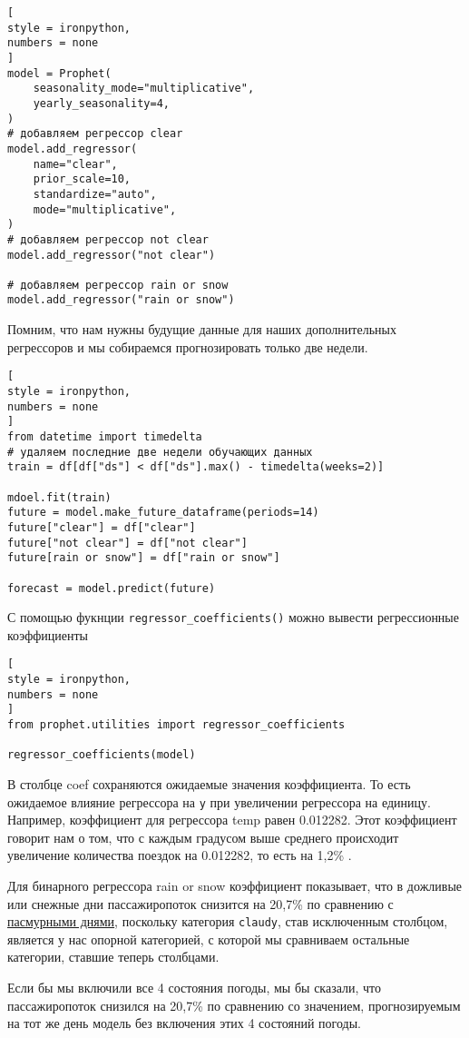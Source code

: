 \documentclass[%
	11pt,
	a4paper,
	utf8,
		]{article}
\begin{document}
\begin{lstlisting}[
style = ironpython,
numbers = none
]
model = Prophet(
    seasonality_mode="multiplicative",
    yearly_seasonality=4,
)
# добавляем регрессор clear
model.add_regressor(
    name="clear",
    prior_scale=10,
    standardize="auto",
    mode="multiplicative",
)
# добавляем регрессор not clear
model.add_regressor("not clear")

# добавляем регрессор rain or snow
model.add_regressor("rain or snow")
\end{lstlisting}

Помним, что нам нужны будущие данные для наших дополнительных регрессоров и мы собираемся прогнозировать только две недели.
\begin{lstlisting}[
style = ironpython,
numbers = none
]
from datetime import timedelta
# удаляем последние две недели обучающих данных
train = df[df["ds"] < df["ds"].max() - timedelta(weeks=2)]

mdoel.fit(train)
future = model.make_future_dataframe(periods=14)
future["clear"] = df["clear"]
future["not clear"] = df["not clear"]
future[rain or snow"] = df["rain or snow"]

forecast = model.predict(future)
\end{lstlisting}

С помощью фукнции \verb|regressor_coefficients()| можно вывести регрессионные коэффициенты
\begin{lstlisting}[
style = ironpython,
numbers = none	
]
from prophet.utilities import regressor_coefficients

regressor_coefficients(model)
\end{lstlisting}

В столбце coef сохраняются ожидаемые значения коэффициента. То есть ожидаемое влияние регрессора на \verb|y| при увеличении регрессора на единицу. Например, коэффициент для регрессора temp равен 0.012282. Этот коэффициент говорит нам о том, что с каждым градусом выше среднего происходит увеличение количества поездок на 0.012282, то есть на 1,2\% \cite[]{gruzdev:time-series-2022}.

Для бинарного регрессора rain or snow коэффициент показывает, что в дожливые или снежные дни пассажиропоток снизится на 20,7\% по сравнению с \underline{пасмурными днями}, поскольку категория \verb|claudy|, став исключенным столбцом, является у нас опорной категорией, с которой мы сравниваем остальные категории, ставшие теперь столбцами.

Если бы мы включили все 4 состояния погоды, мы бы сказали, что пассажиропоток снизился на 20,7\% по сравнению со значением, прогнозируемым на тот же день модель без включения этих 4 состояний погоды.
\end{document}
